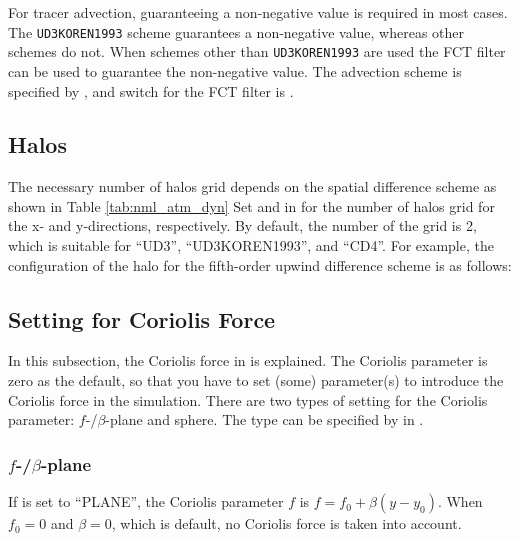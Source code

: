For tracer advection, guaranteeing a non-negative value is required in most cases.\\
The \verb|UD3KOREN1993| scheme guarantees a non-negative value, whereas other schemes do not.
When schemes other than \verb|UD3KOREN1993| are used the FCT filter can be used to guarantee the non-negative value.
The advection scheme is specified by , and switch for the FCT filter is .


\subsection{Halos}

The necessary number of halos grid depends on the spatial difference scheme as shown in Table \ref{tab:nml_atm_dyn}
Set  and  in  for the number of halos grid for the x- and y-directions, respectively.
By default, the number of the grid is 2, which is suitable for ``UD3'', ``UD3KOREN1993'', and ``CD4''.
For example, the configuration of the halo for the fifth-order upwind difference scheme is as follows:



\subsection{Setting for Coriolis Force} \label{subsec:coriolis}

In this subsection, the Coriolis force in \scalerm is explained.
The Coriolis parameter is zero as the default, so that you have to set (some) parameter(s) to introduce the Coriolis force in the simulation.
There are two types of setting for the Coriolis parameter: $f$-/$\beta$-plane and sphere.
The type can be specified by  in .

\subsubsection{$f$-/$\beta$-plane}
If  is set to ``PLANE'', the Coriolis parameter $f$ is $f=f_0 + \beta (y-y_0)$.
When $f_0=0$ and $\beta=0$, which is default, no Coriolis force is taken into account.

